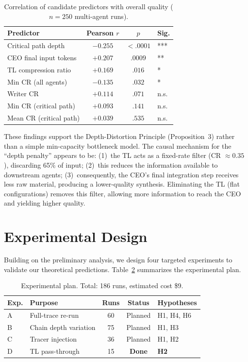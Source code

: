 \documentclass[conference]{IEEEtran}
\begin{document}
\begin{table}[t]
\centering
\caption{Correlation of candidate predictors with overall quality ($n = 250$ multi-agent runs).}
\label{tab:correlations}
\small
\begin{tabular}{lccl}
\toprule
\textbf{Predictor} & \textbf{Pearson} $r$ & $p$ & \textbf{Sig.} \\
\midrule
Critical path depth       & $-0.255$ & $< .0001$ & *** \\
CEO final input tokens    & $+0.207$ & $.0009$   & ** \\
TL compression ratio      & $+0.169$ & $.016$    & * \\
Min CR (all agents)       & $-0.135$ & $.032$    & * \\
Writer CR                 & $+0.114$ & $.071$    & n.s. \\
Min CR (critical path)    & $+0.093$ & $.141$    & n.s. \\
Mean CR (critical path)   & $+0.039$ & $.535$    & n.s. \\
\bottomrule
\end{tabular}
\end{table}

These findings support the Depth-Distortion Principle (Proposition~3) rather than a simple min-capacity bottleneck model.
The causal mechanism for the ``depth penalty'' appears to be:
(1)~the TL acts as a fixed-rate filter (CR $\approx 0.35$), discarding 65\% of input;
(2)~this reduces the information available to downstream agents;
(3)~consequently, the CEO's final integration step receives less raw material, producing a lower-quality synthesis.
Eliminating the TL (flat configurations) removes this filter, allowing more information to reach the CEO and yielding higher quality.


\section{Experimental Design}
\label{sec:experiment}

Building on the preliminary analysis, we design four targeted experiments to validate our theoretical predictions.
Table~\ref{tab:experiments} summarizes the experimental plan.

\begin{table}[t]
\centering
\caption{Experimental plan. Total: 186 runs, estimated cost \$9.}
\label{tab:experiments}
\small
\begin{tabular}{llccl}
\toprule
\textbf{Exp.} & \textbf{Purpose} & \textbf{Runs} & \textbf{Status} & \textbf{Hypotheses} \\
\midrule
A & Full-trace re-run & 60 & Planned & H1, H4, H6 \\
B & Chain depth variation & 75 & Planned & H1, H3 \\
C & Tracer injection & 36 & Planned & H1, H2 \\
D & TL pass-through & 15 & \textbf{Done} & \textbf{H2} \\
\bottomrule
\end{tabular}
\end{table}
\end{document}

